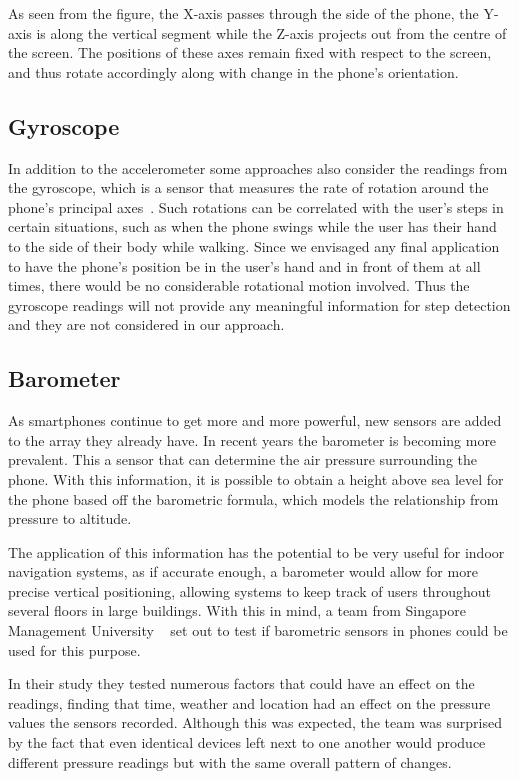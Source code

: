 \documentclass[12pt,a4paper]{report}
\begin{document}
As seen from the figure, the X-axis passes through the side of the phone, the Y-axis is along the vertical segment while the Z-axis projects out from the centre of the screen. The positions of these axes remain fixed with respect to the screen, and thus rotate accordingly along with change in the phone's orientation. 

\subsection{Gyroscope}
In addition to the accelerometer some approaches also consider the readings from the gyroscope, which is a sensor that measures the rate of rotation around the phone's principal axes~\cite{accelerometerAcceleration}. Such rotations can be correlated with the user's steps in certain situations, such as when the phone swings while the user has their hand to the side of their body while walking. Since we envisaged any final application to have the phone's position be in the user's hand and in front of them at all times, there would be no considerable rotational motion involved. Thus the gyroscope readings will not provide any meaningful information for step detection and they are not considered in our approach. 

\subsection{Barometer}

As smartphones continue to get more and more powerful, new sensors are added to the array they already have. In recent years the barometer is becoming more prevalent. This a sensor that can determine the air pressure surrounding the phone. With this information, it is possible to obtain a height above sea level for the phone based off the barometric formula, which models the relationship from pressure to altitude.

The application of this information has the potential to be very useful for indoor navigation systems, as if accurate enough, a barometer would allow for more precise vertical positioning, allowing systems to keep track of users throughout several floors in large buildings. With this in mind, a team from Singapore Management University ~\cite{baro2014} set out to test if barometric sensors in phones could be used for this purpose.

In their study they tested numerous factors that could have an effect on the readings, finding that  time, weather and location had an effect on the pressure values the sensors recorded. Although this was expected, the team was surprised by the fact that even identical devices left next to one another would produce different pressure readings but with the same overall pattern of changes. ~\cite[p.2]{baro2014}
\end{document}
